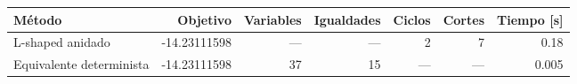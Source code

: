 {\small
\begin{tabular}{lrrrrrr}
\toprule
Método & Objetivo & Variables & Igualdades & Ciclos & Cortes & Tiempo [s] \\
\midrule
L-shaped anidado & -14.23111598 & — & — & 2 & 7 & 0.18 \\
Equivalente determinista & -14.23111598 & 37 & 15 & — & — & 0.005 \\
\bottomrule
\end{tabular}
}
